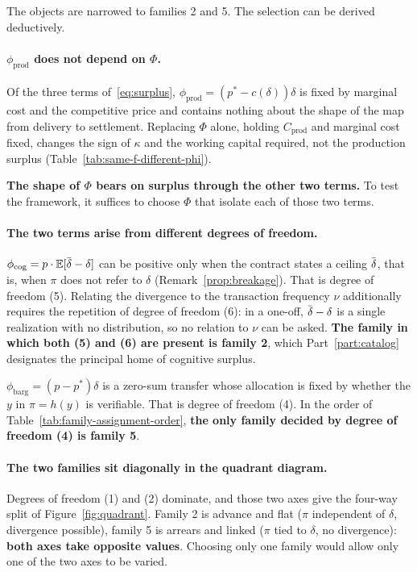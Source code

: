 The objects are narrowed to families 2 and 5. The selection can be derived deductively.

\paragraph{$\phi_{\mathrm{prod}}$ does not depend on $\Phi$.}

Of the three terms of~\eqref{eq:surplus}, $\phi_{\mathrm{prod}}=(p^{\ast}-c(\delta))\delta$
is fixed by marginal cost and the competitive price and contains nothing about the shape of
the map from delivery to settlement. Replacing $\Phi$ alone, holding $C_{\mathrm{prod}}$ and
marginal cost fixed, changes the sign of $\kappa$ and the working capital required, not the
production surplus (Table~\ref{tab:same-f-different-phi}).

\textbf{The shape of $\Phi$ bears on surplus through the other two terms.} To test the
framework, it suffices to choose $\Phi$ that isolate each of those two terms.

\paragraph{The two terms arise from different degrees of freedom.}

$\phi_{\mathrm{cog}}=p\cdot\E[\dbar-\delta]$ can be positive only when the contract states a
ceiling $\dbar$, that is, when $\pi$ does not refer to $\delta$
(Remark~\ref{prop:breakage}). That is degree of freedom (5). Relating the divergence to the
transaction frequency $\nu$ additionally requires the repetition of degree of freedom (6):
in a one-off, $\dbar-\delta$ is a single realization with no distribution, so no relation to
$\nu$ can be asked. \textbf{The family in which both (5) and (6) are present is family 2},
which Part~\ref{part:catalog} designates the principal home of cognitive surplus.

$\phi_{\mathrm{barg}}=(p-p^{\ast})\delta$ is a zero-sum transfer whose allocation is fixed by
whether the $y$ in $\pi=h(y)$ is verifiable. That is degree of freedom (4). In the order of
Table~\ref{tab:family-assignment-order},
\textbf{the only family decided by degree of freedom (4) is family 5}.

\paragraph{The two families sit diagonally in the quadrant diagram.}

Degrees of freedom (1) and (2) dominate, and those two axes give the four-way split of
Figure~\ref{fig:quadrant}. Family 2 is advance and flat ($\pi$ independent of $\delta$,
divergence possible), family 5 is arrears and linked ($\pi$ tied to $\delta$, no divergence):
\textbf{both axes take opposite values}. Choosing only one family would allow only one of
the two axes to be varied.

